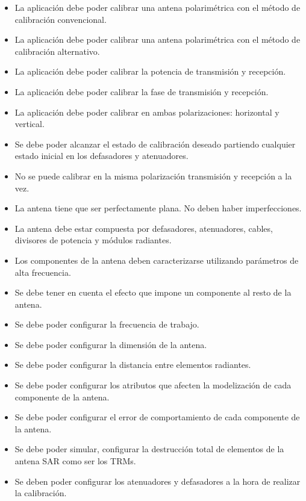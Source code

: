 \documentclass[a4paper,10pt]{article}
\begin{document}
\begin{itemize}
    \item La aplicación debe poder calibrar una antena polarimétrica con el 
método de calibración convencional.
    
    \item La aplicación debe poder calibrar una antena polarimétrica con el
método de calibración alternativo.
    
    \item La aplicación debe poder calibrar la potencia de transmisión y 
recepción.
    
    \item La aplicación debe poder calibrar la fase de transmisión y 
recepción.
    
    \item La aplicación debe poder calibrar en ambas polarizaciones: horizontal
y vertical.
    
    \item Se debe poder alcanzar el estado de calibración deseado partiendo 
cualquier estado inicial en los defasadores y atenuadores.
    
    \item No se puede calibrar en la misma polarización transmisión y recepción 
a la vez.
    
    \item La antena tiene que ser perfectamente plana. No deben haber 
imperfecciones.
    
    \item La antena debe estar compuesta por defasadores, atenuadores, cables, 
divisores de potencia y módulos radiantes.
    
    \item Los componentes de la antena deben caracterizarse utilizando 
parámetros de alta frecuencia.
    
    \item Se debe tener en cuenta el efecto que impone un componente al resto de
la antena.
    
    \item Se debe poder configurar la frecuencia de trabajo.
    \item Se debe poder configurar la dimensión de la antena.
    \item Se debe poder configurar la distancia entre elementos radiantes.
    \item Se debe poder configurar los atributos que afecten la modelización de
cada componente de la antena. 
    
    \item Se debe poder configurar el error de comportamiento de cada
componente de la antena.
    
    \item Se debe poder simular, configurar la destrucción total de elementos de
la antena SAR como ser los TRMs.

    \item Se deben poder configurar los atenuadores y defasadores a la hora de 
realizar la calibración. 
\end{itemize}
\end{document}
